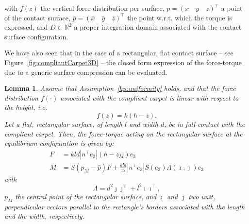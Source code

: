 \documentclass[12pt,a4paper,twoside]{article}
\newtheorem{boldLemma}{\bf{Lemma}}
\begin{document}
with $f(z)$  the vertical force distribution per surface, $p=(x \quad y \quad z)^\top$ a point of the contact surface,  
$\bar{p} = (\bar{x} \quad \bar{y} \quad \bar{z})^\top$ the point w.r.t. which the torque is expressed, and $D \subset \mathbb{R}^2$ a proper integration domain associated with the contact surface configuration.
%
%        

We have also seen that in the case 
of a rectangular, flat contact surface -- see Figure~\ref{fig:compliantCarpet3D} -- the closed form expression of the force-torque due to a generic surface compression can be evaluated. 

\begin{boldLemma}
\label{lemma3D}
Assume that Assumption~\ref{hp:uniformity} holds, and that the force distribution $f(\cdot)$ associated with the compliant carpet  is linear with respect to the height, i.e.
\begin{equation}
\label{distributionLinear3D}
f(z) = k(h-z).
\end{equation}
Let a flat, rectangular surface, of length $l$ and width $d$, be in full-contact with the compliant carpet. Then, the force-torque acting on the  rectangular surface at the equilibrium configuration is given by: 
\begin{subequations}
\label{forceTorqueOn3DBentPlate}
    \begin{alignat}{2}
\label{force3D}
F &= kld|n^\top e_3|\left(h-z_M \right)e_3 \\
\label{torque3D}
M &= S(p_M - \bar{p})F + \frac{kld}{12}|n^\top e_3|S(e_3)\Lambda(\imath,\jmath)e_3 
    \end{alignat}
\end{subequations}
with 
\begin{equation}
\Lambda = d^2 \jmath \jmath^\top + l^2 \imath \imath^\top ,
\end{equation}
 $p_M$  the central point of the rectangular surface,  
and $\imath$ and 
$\jmath$ two unit, perpendicular vectors parallel to the rectangle's borders associated with the length and the width, respectively.
\end{boldLemma}
\end{document}
